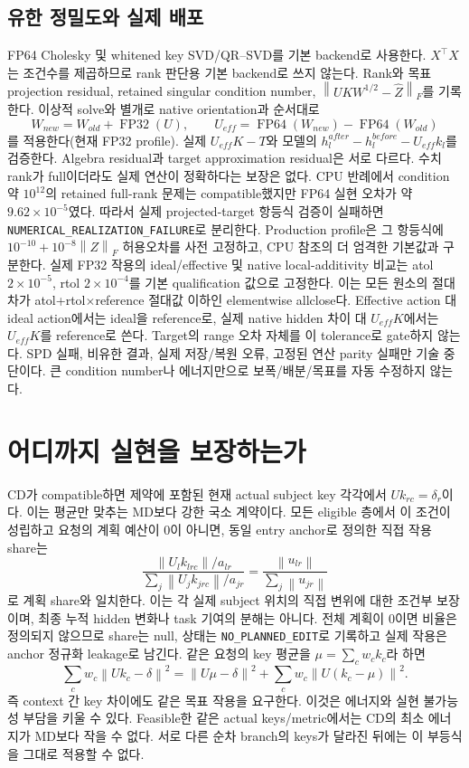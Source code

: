 \documentclass[11pt]{article}
\newcommand{\norm}[1]{\left\lVert #1\right\rVert}
\begin{document}
\subsection{유한 정밀도와 실제 배포}
FP64 Cholesky 및 whitened key SVD/QR--SVD를 기본 backend로 사용한다.
$X^\top X$는 조건수를 제곱하므로 rank 판단용 기본 backend로 쓰지 않는다.
Rank와 목표 projection residual, retained singular condition number,
$\norm{UKW^{1/2}-\widehat Z}_F$를 기록한다.
이상적 solve와 별개로 native orientation과 순서대로
\[
 W_{new}=W_{old}+\operatorname{FP32}(U),\qquad
 U_{eff}=\operatorname{FP64}(W_{new})-\operatorname{FP64}(W_{old})
\]
를 적용한다(현재 FP32 profile). 실제 $U_{eff}K-T$와 모델의
$h_l^{after}-h_l^{before}-U_{eff}k_l$를 검증한다.
Algebra residual과 target approximation residual은 서로 다르다.
수치 rank가 full이더라도 실제 연산이 정확하다는 보장은 없다.
CPU 반례에서 condition 약 $10^{12}$의 retained full-rank 문제는 compatible했지만
FP64 실현 오차가 약 $9.62\times10^{-5}$였다. 따라서 실제 projected-target
항등식 검증이 실패하면 \texttt{NUMERICAL\_REALIZATION\_FAILURE}로 분리한다.
Production profile은 그 항등식에 $10^{-10}+10^{-8}\norm{Z}_F$ 허용오차를
사전 고정하고, CPU 참조의 더 엄격한 기본값과 구분한다.
실제 FP32 작용의 ideal/effective 및 native local-additivity 비교는
atol $2\times10^{-5}$, rtol $2\times10^{-4}$를 기본 qualification 값으로
고정한다. 이는 모든 원소의 절대차가 atol+rtol$\times$reference 절대값 이하인
elementwise allclose다. Effective action 대 ideal action에서는 ideal을 reference로,
실제 native hidden 차이 대 $U_{eff}K$에서는 $U_{eff}K$를 reference로 쓴다.
Target의 range 오차 자체를 이 tolerance로 gate하지 않는다.
SPD 실패, 비유한 결과, 실제 저장/복원 오류, 고정된 연산 parity 실패만 기술 중단이다.
큰 condition number나 에너지만으로 보폭/배분/목표를 자동 수정하지 않는다.

\section{어디까지 실현을 보장하는가}
CD가 compatible하면 제약에 포함된 현재 actual subject key 각각에서
$U k_{rc}=\delta_r$이다. 이는 평균만 맞추는 MD보다 강한 국소 계약이다.
모든 eligible 층에서 이 조건이 성립하고 요청의 계획 예산이 0이 아니면,
동일 entry anchor로 정의한 직접 작용 share는
\[
 \frac{\norm{U_lk_{lrc}}/a_{lr}}{\sum_j\norm{U_jk_{jrc}}/a_{jr}}
 =\frac{\norm{u_{lr}}}{\sum_j\norm{u_{jr}}}
\]
로 계획 share와 일치한다. 이는 각 실제 subject 위치의 직접 변위에 대한 조건부
보장이며, 최종 누적 hidden 변화나 task 기여의 분해는 아니다.
전체 계획이 0이면 비율은 정의되지 않으므로 share는 null, 상태는
\texttt{NO\_PLANNED\_EDIT}로 기록하고 실제 작용은 anchor 정규화 leakage로 남긴다.
같은 요청의 key 평균을 $\mu=\sum_cw_ck_c$라 하면
\[
 \sum_c w_c\norm{Uk_c-\delta}^2
 =\norm{U\mu-\delta}^2+\sum_cw_c\norm{U(k_c-\mu)}^2.
\]
즉 context 간 key 차이에도 같은 목표 작용을 요구한다. 이것은 에너지와
실현 불가능성 부담을 키울 수 있다. Feasible한 같은 actual keys/metric에서는
CD의 최소 에너지가 MD보다 작을 수 없다. 서로 다른 순차 branch의 keys가 달라진
뒤에는 이 부등식을 그대로 적용할 수 없다.
\end{document}
